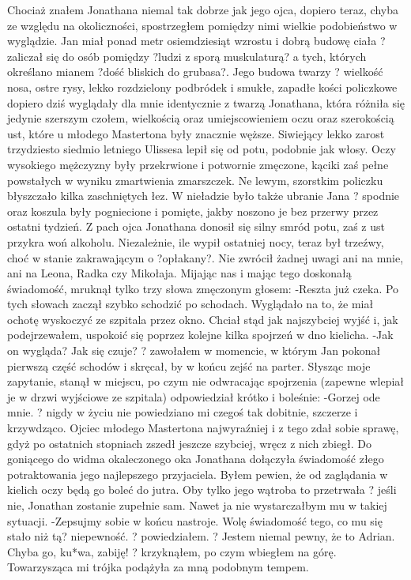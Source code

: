 \documentclass[../MAIN.tex]{subfiles}
\begin{document}
Chociaż znałem Jonathana niemal tak dobrze jak jego ojca, dopiero teraz, chyba ze względu na okoliczności, spostrzegłem pomiędzy nimi wielkie podobieństwo w wyglądzie.
Jan miał ponad metr osiemdziesiąt wzrostu i dobrą budowę ciała ? zaliczał się do osób pomiędzy ?ludzi z sporą muskulaturą? a tych, których określano mianem ?dość bliskich do grubasa?.
Jego budowa twarzy ? wielkość nosa, ostre rysy, lekko rozdzielony podbródek i smukłe, zapadłe kości policzkowe dopiero dziś wyglądały dla mnie identycznie z twarzą Jonathana, która różniła się jedynie szerszym czołem, wielkością oraz umiejscowieniem oczu oraz szerokością ust, które u młodego Mastertona były znacznie węższe.
Siwiejący lekko zarost trzydziesto siedmio letniego Ulissesa lepił się od potu, podobnie jak włosy. Oczy wysokiego mężczyzny były przekrwione i potwornie zmęczone, kąciki zaś pełne powstałych w wyniku zmartwienia zmarszczek. Ne lewym, szorstkim policzku błyszczało kilka zaschniętych łez.
W nieładzie było także ubranie Jana ? spodnie oraz koszula były pogniecione i pomięte, jakby noszono je bez przerwy przez ostatni tydzień. Z pach ojca Jonathana donosił się silny smród potu, zaś z ust przykra woń alkoholu. Niezależnie, ile wypił ostatniej nocy, teraz był trzeźwy, choć w stanie zakrawającym o ?opłakany?.
Nie zwrócił żadnej uwagi ani na mnie, ani na Leona, Radka czy Mikołaja. Mijając nas i mając tego doskonałą świadomość, mruknął tylko trzy słowa zmęczonym głosem:
-Reszta już czeka.
Po tych słowach zaczął szybko schodzić po schodach. Wyglądało na to, że miał ochotę wyskoczyć ze szpitala przez okno.
Chciał stąd jak najszybciej wyjść i, jak podejrzewałem, uspokoić się poprzez kolejne kilka spojrzeń w dno kielicha.
-Jak on wygląda? Jak się czuje? ? zawołałem w momencie, w którym Jan pokonał pierwszą część schodów i skręcał, by w końcu zejść na parter. Słysząc moje zapytanie, stanął w miejscu, po czym nie odwracając spojrzenia (zapewne wlepiał je w drzwi wyjściowe ze szpitala) odpowiedział krótko i boleśnie:
-Gorzej ode mnie. ? nigdy w życiu nie powiedziano mi czegoś tak dobitnie, szczerze i krzywdząco. Ojciec młodego Mastertona najwyraźniej i z tego zdał sobie sprawę, gdyż po ostatnich stopniach zszedł jeszcze szybciej, wręcz z nich zbiegł.
Do goniącego do widma okaleczonego oka Jonathana dołączyła świadomość złego potraktowania jego najlepszego przyjaciela.
Byłem pewien, że od zaglądania w kielich oczy będą go boleć do jutra.
Oby tylko jego wątroba to przetrwała ? jeśli nie, Jonathan zostanie zupełnie sam.
Nawet ja nie wystarczałbym mu w takiej sytuacji.
-Zepsujmy sobie w końcu nastroje. Wolę świadomość tego, co mu się stało niż tą? niepewność. ? powiedziałem. ? Jestem niemal pewny, że to Adrian. Chyba go, ku*wa, zabiję! ? krzyknąłem, po czym wbiegłem na górę. Towarzysząca mi trójka podążyła za mną podobnym tempem.
\end{document}
